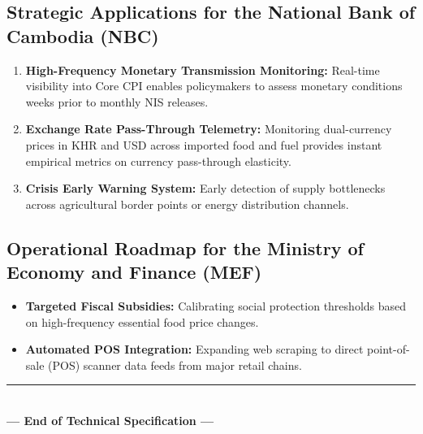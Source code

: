 \documentclass[11pt,a4paper]{article}
\begin{document}
\subsection{Strategic Applications for the National Bank of Cambodia (NBC)}
\begin{enumerate}
    \item \textbf{High-Frequency Monetary Transmission Monitoring:}
        Real-time visibility into Core CPI enables policymakers to assess monetary conditions weeks prior to monthly NIS releases.
    \item \textbf{Exchange Rate Pass-Through Telemetry:}
        Monitoring dual-currency prices in KHR and USD across imported food and fuel provides instant empirical metrics on currency pass-through elasticity.
    \item \textbf{Crisis Early Warning System:}
        Early detection of supply bottlenecks across agricultural border points or energy distribution channels.
\end{enumerate}

\subsection{Operational Roadmap for the Ministry of Economy and Finance (MEF)}
\begin{itemize}[noitemsep]
    \item \textbf{Targeted Fiscal Subsidies:} Calibrating social protection thresholds based on high-frequency essential food price changes.
    \item \textbf{Automated POS Integration:} Expanding web scraping to direct point-of-sale (POS) scanner data feeds from major retail chains.
\end{itemize}

\vspace{1cm}
\begin{center}
\rule{0.6\textwidth}{0.4pt}\\
\vspace{0.3cm}
\textbf{--- End of Technical Specification ---}
\end{center}
\end{document}

